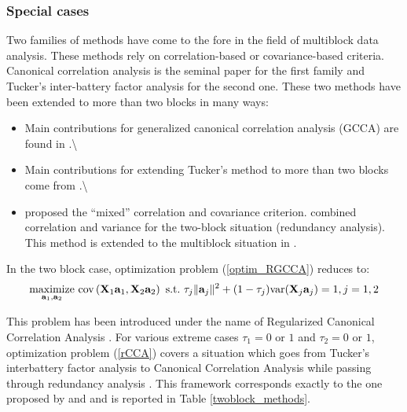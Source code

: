 \documentclass[
]{jss}
\begin{document}
\hypertarget{special-cases}{%
\subsubsection{Special cases}\label{special-cases}}

Two families of methods have come to the fore in the field of multiblock
data analysis. These methods rely on correlation-based or
covariance-based criteria. Canonical correlation analysis
\citep{Hotelling1936} is the seminal paper for the first family and
Tucker's inter-battery factor analysis \citep{Tucker1958} for the second
one. These two methods have been extended to more than two blocks in
many ways:

\begin{itemize}
\item
  Main contributions for generalized canonical correlation analysis
  (GCCA) are found in \citep[\citet{Carroll1968a},
  \citet{Kettenring1971}, \citet{Wold1982}, \citet{Wold1985},
  \citet{Hanafi2007}]{Horst1961}.\textbackslash{}
\item
  Main contributions for extending Tucker's method to more than two
  blocks come from \citep[\citet{Chessel1996}, \citet{Hanafi2006},
  \citet{Hanafi2010}, \citet{Hanafi2011}, \citet{Hanafi2006},
  \citet{Kramer2007}, \citet{Smilde2003}, \citet{TenBerge1988},
  \citet{VandeGeer1984}, \citet{Westerhuis1998}, \citet{Wold1982},
  \citet{Wold1985}]{Carroll1968b}.\textbackslash{}
\item
  \citep{Carroll1968b} proposed the ``mixed'' correlation and covariance
  criterion. \citep{Wollenberg1977} combined correlation and variance
  for the two-block situation (redundancy analysis). This method is
  extended to the multiblock situation in
  \citep[\citet{Tenenhaus2017}]{Tenenhaus2011}.
\end{itemize}

In the two block case, optimization problem (\ref{optim_RGCCA}) reduces
to: \begin{equation}
\underset{\mathbf{a}_1, \mathbf{a}_2}{\text{maximize}} \text{
cov}\left(\mathbf{X}_1\mathbf{a}_1, \mathbf{X}_2\mathbf{a}_2 \right) \mathrm{~s.t.~} \tau_j
\Vert \mathbf{a}_j \Vert^2 + (1-\tau_j)\text{var}(\mathbf{X}_j\mathbf{a}_j) = 1, j =1,2 
\label{rCCA} 
\end{equation}

This problem has been introduced under the name of Regularized Canonical
Correlation Analysis \citep[\citet{Leurgans1993},
\citet{Shawe2004}]{Vinod1976}. For various extreme cases \(\tau_1 = 0\)
or \(1\) and \(\tau_2 = 0\) or \(1\), optimization problem (\ref{rCCA})
covers a situation which goes from Tucker's interbattery factor analysis
\citep{Tucker1958} to Canonical Correlation Analysis
\citep{Hotelling1933} while passing through redundancy analysis
\citep{Wollenberg1977}. This framework corresponds exactly to the one
proposed by \citep{Borga1997} and \citep{Burnham1996} and is reported in
Table \ref{twoblock_methods}.
\end{document}
